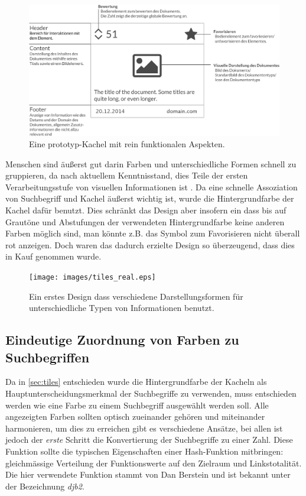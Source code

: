 \documentclass[12pt,twoside]{book}
\begin{document}
\begin{figure}[H]
    \centering
    \includegraphics[width=1.0\textwidth]{images/tiles.eps}
    \caption{Eine prototyp-Kachel mit rein funktionalen Aspekten.}
    \label{fig:tile_prototype}
\end{figure}

Menschen sind äußerst gut darin Farben und unterschiedliche Formen schnell zu gruppieren, da nach aktuellem Kenntnisstand, dies Teile der ersten Verarbeitungsstufe von visuellen Informationen ist \citep{treisman1987merkmale}. Da eine schnelle Assoziation von Suchbegriff und Kachel äußerst wichtig ist, wurde die Hintergrundfarbe der Kachel dafür benutzt. Dies schränkt das Design aber insofern ein dass bis auf Grautöne und Abstufungen der verwendeten Hintergrundfarbe keine anderen Farben möglich sind, man könnte z.B. das Symbol zum Favorisieren nicht überall rot anzeigen. Doch waren das dadurch erzielte Design so überzeugend, dass dies in Kauf genommen wurde.

\begin{figure}[H]
    \centering
    \texttt{[image: images/tiles\_real.eps]}
    \caption{Ein erstes Design dass verschiedene Darstellungsformen für unterschiedliche Typen von Informationen benutzt.}
    \label{fig:awesome_image}
\end{figure}

\subsection{Eindeutige Zuordnung von Farben zu Suchbegriffen}

Da in \ref{sec:tiles} entschieden wurde die Hintergrundfarbe der Kacheln als Hauptunterscheidungsmerkmal der Suchbegriffe zu verwenden, muss entschieden werden wie eine Farbe zu einem Suchbegriff ausgewählt werden soll.
Alle angezeigten Farben sollten optisch zueinander gehören und miteinander harmonieren, um dies zu erreichen gibt es verschiedene Ansätze, bei allen ist jedoch der \textit{erste} Schritt die Konvertierung der Suchbegriffe zu einer Zahl. Diese Funktion sollte die typischen Eigenschaften einer  Hash-Funktion mitbringen: gleichmässige Verteilung der Funktionswerte auf den Zielraum und Linkstotalität.
Die hier verwendete Funktion stammt von Dan Berstein und ist bekannt unter der Bezeichnung \textit{djb2}.
\end{document}
